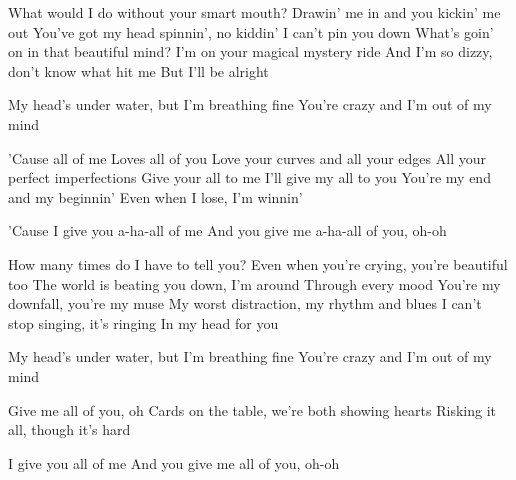 \begin{verse*}
What would I do without your smart mouth?
Drawin' me in and you kickin' me out
You've got my head spinnin', no kiddin'
I can't pin you down
What's goin' on in that beautiful mind?
I'm on your magical mystery ride
And I'm so dizzy, don't know what hit me
But I'll be alright
\end{verse*}

\begin{bridge*}
My head's under water, but I'm breathing fine
You're crazy and I'm out of my mind
\end{bridge*}

\begin{chorus}
'Cause all of me
Loves all of you
Love your curves and all your edges
All your perfect imperfections
Give your all to me
I'll give my all to you
You're my end and my beginnin'
Even when I lose, I'm winnin'
\end{chorus}

\begin{bridge*}
'Cause I give you a-ha-all of me
And you give me a-ha-all of you, oh-oh
\end{bridge*}

\begin{verse*}
How many times do I have to tell you?
Even when you're crying, you're beautiful too
The world is beating you down, I'm around
Through every mood
You're my downfall, you're my muse
My worst distraction, my rhythm and blues
I can't stop singing, it's ringing
In my head for you
\end{verse*}

\begin{bridge*}
My head's under water, but I'm breathing fine
You're crazy and I'm out of my mind
\end{bridge*}

\thechorus

\begin{verse*}
Give me all of you, oh
Cards on the table, we're both showing hearts
Risking it all, though it's hard
\end{verse*}

\thechorus

\begin{verse*}
I give you all of me
And you give me all of you, oh-oh
\end{verse*}
